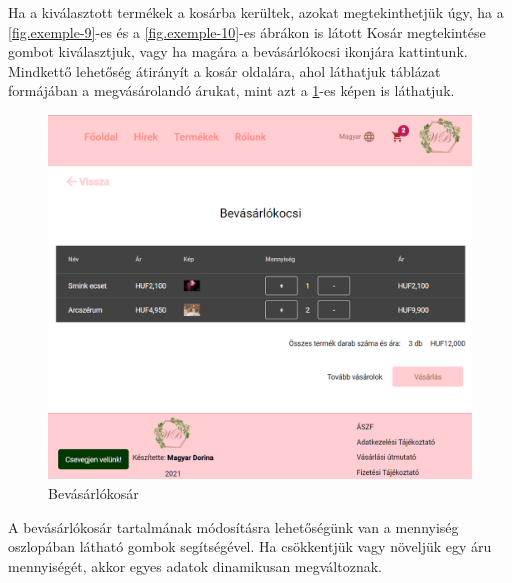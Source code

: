 Ha a kiválasztott termékek a kosárba kerültek, azokat megtekinthetjük úgy, ha a \ref{fig.exemple-9}-es és a \ref{fig.exemple-10}-es ábrákon is látott Kosár megtekintése gombot kiválasztjuk, vagy ha magára a bevásárlókocsi ikonjára kattintunk. Mindkettő lehetőség átirányít a kosár oldalára, ahol láthatjuk táblázat formájában a megvásárolandó árukat, mint azt a \ref{fig.exemple-11}-es képen is láthatjuk.
\begin{figure}[H]
	\centering
	\includegraphics[width=1.0\textwidth]{images/kosar.png}
	\caption{Bevásárlókosár}
	\label{fig.exemple-11}
\end{figure}

A bevásárlókosár tartalmának módosításra lehetőségünk van a mennyiség oszlopában látható gombok segítségével. Ha csökkentjük vagy növeljük egy áru mennyiségét, akkor egyes adatok dinamikusan megváltoznak.

